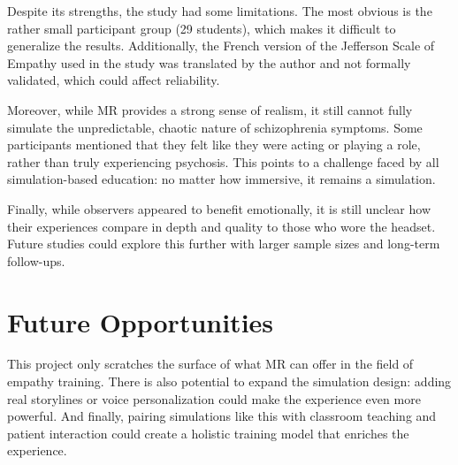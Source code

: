 Despite its strengths, the study had some limitations. The most obvious is the rather small participant group (29 students), which makes it difficult to generalize the results. Additionally, the French version of the Jefferson Scale of Empathy used in the study was translated by the author and not formally validated, which could affect reliability.

Moreover, while MR provides a strong sense of realism, it still cannot fully simulate the unpredictable, chaotic nature of schizophrenia symptoms. Some participants mentioned that they felt like they were acting or playing a role, rather than truly experiencing psychosis. This points to a challenge faced by all simulation-based education: no matter how immersive, it remains a simulation.

Finally, while observers appeared to benefit emotionally, it is still unclear how their experiences compare in depth and quality to those who wore the headset. Future studies could explore this further with larger sample sizes and long-term follow-ups.

\section{Future Opportunities}

This project only scratches the surface of what MR can offer in the field of empathy training. There is also potential to expand the simulation design: adding real storylines or voice personalization could make the experience even more powerful. And finally, pairing simulations like this with classroom teaching and patient interaction could create a holistic training model that enriches the experience.
